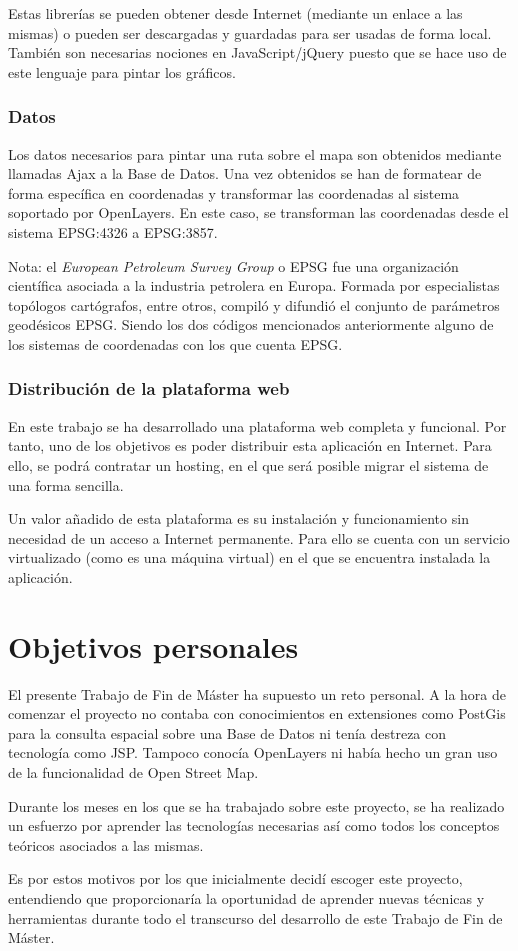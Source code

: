 Estas librerías se pueden obtener desde Internet (mediante un enlace a las mismas) o pueden ser descargadas y guardadas
para ser usadas de forma local. También son necesarias nociones en JavaScript/jQuery puesto que se hace uso de este lenguaje para pintar los gráficos.

\subsubsection{Datos}
Los datos necesarios para pintar una ruta sobre el mapa son obtenidos mediante llamadas Ajax a la Base de Datos. Una vez obtenidos se han de formatear de forma específica en coordenadas y transformar las coordenadas al sistema soportado por OpenLayers. En este caso, se transforman las coordenadas desde el sistema EPSG:4326 a EPSG:3857.

Nota: el \textit{European Petroleum Survey Group} o EPSG fue una organización científica asociada a la industria petrolera en Europa. Formada por especialistas topólogos cartógrafos, entre otros, compiló y difundió el conjunto de parámetros geodésicos EPSG. Siendo los dos códigos mencionados anteriormente alguno de los sistemas de coordenadas con los que cuenta EPSG.

\subsubsection{Distribución de la plataforma web}

En este trabajo se ha desarrollado una plataforma web completa y funcional. Por tanto, uno de los objetivos es poder distribuir esta aplicación en Internet. Para ello, se podrá contratar un hosting, en el que será posible migrar el sistema de una forma sencilla. 

Un valor añadido de esta plataforma es su instalación y funcionamiento sin necesidad de un
acceso a Internet permanente. Para ello se cuenta con un servicio virtualizado (como es una máquina
virtual) en el que se encuentra instalada la aplicación.


\section{Objetivos personales}

El presente Trabajo de Fin de Máster ha supuesto un reto personal. A la hora de comenzar el proyecto no contaba con conocimientos en extensiones como PostGis para la consulta espacial sobre una Base de Datos ni tenía destreza con tecnología como JSP. Tampoco conocía OpenLayers ni había hecho un gran uso de la funcionalidad de Open Street Map. 

Durante los meses en los que se ha trabajado sobre este proyecto, se ha realizado un esfuerzo por aprender las tecnologías necesarias así como todos los conceptos teóricos asociados a las mismas.

Es por estos motivos por los que inicialmente decidí escoger este proyecto, entendiendo que proporcionaría la oportunidad de aprender nuevas técnicas y herramientas durante todo el transcurso del desarrollo de este Trabajo de Fin de Máster. 


